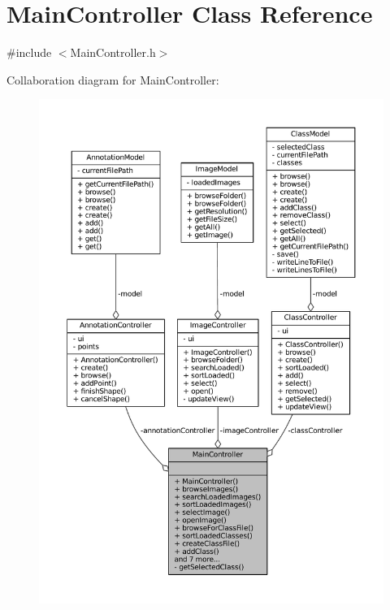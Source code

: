 \hypertarget{classMainController}{}\section{Main\+Controller Class Reference}
\label{classMainController}


{\ttfamily \#include $<$Main\+Controller.\+h$>$}



Collaboration diagram for Main\+Controller\+:
\nopagebreak
\begin{figure}[H]
\begin{center}
\leavevmode
\includegraphics[width=350pt]{classMainController__coll__graph}
\end{center}
\end{figure}
